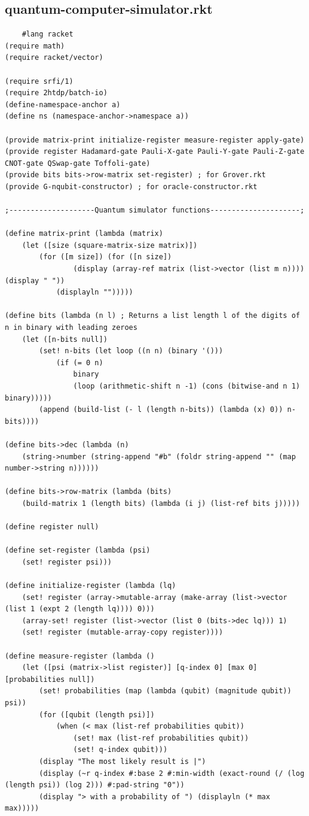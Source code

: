 \documentclass[11pt]{report}
\newcommand{\?}{\stackrel{?}{=}}
\begin{document}
\begin{appendix}
	\chapter{quantum-computer-simulator.rkt}
	\begin{lstlisting}
	#lang racket
(require math)
(require racket/vector)

(require srfi/1)
(require 2htdp/batch-io)
(define-namespace-anchor a)
(define ns (namespace-anchor->namespace a))

(provide matrix-print initialize-register measure-register apply-gate)
(provide register Hadamard-gate Pauli-X-gate Pauli-Y-gate Pauli-Z-gate CNOT-gate QSwap-gate Toffoli-gate)
(provide bits bits->row-matrix set-register) ; for Grover.rkt
(provide G-nqubit-constructor) ; for oracle-constructor.rkt

;--------------------Quantum simulator functions---------------------;

(define matrix-print (lambda (matrix)
	(let ([size (square-matrix-size matrix)])
		(for ([m size]) (for ([n size])
				(display (array-ref matrix (list->vector (list m n)))) (display " "))
			(displayln "")))))

(define bits (lambda (n l) ; Returns a list length l of the digits of n in binary with leading zeroes
	(let ([n-bits null])
		(set! n-bits (let loop ((n n) (binary '()))
			(if (= 0 n) 
				binary
				(loop (arithmetic-shift n -1) (cons (bitwise-and n 1) binary)))))
		(append (build-list (- l (length n-bits)) (lambda (x) 0)) n-bits))))

(define bits->dec (lambda (n)
	(string->number (string-append "#b" (foldr string-append "" (map number->string n))))))

(define bits->row-matrix (lambda (bits)
	(build-matrix 1 (length bits) (lambda (i j) (list-ref bits j)))))

(define register null)

(define set-register (lambda (psi)
	(set! register psi)))

(define initialize-register (lambda (lq)
	(set! register (array->mutable-array (make-array (list->vector (list 1 (expt 2 (length lq)))) 0)))
	(array-set! register (list->vector (list 0 (bits->dec lq))) 1)
	(set! register (mutable-array-copy register))))

(define measure-register (lambda ()
	(let ([psi (matrix->list register)] [q-index 0] [max 0] [probabilities null])
		(set! probabilities (map (lambda (qubit) (magnitude qubit)) psi))
		(for ([qubit (length psi)])
			(when (< max (list-ref probabilities qubit))
				(set! max (list-ref probabilities qubit))
				(set! q-index qubit)))
		(display "The most likely result is |") 
		(display (~r q-index #:base 2 #:min-width (exact-round (/ (log (length psi)) (log 2))) #:pad-string "0"))
		(display "> with a probability of ") (displayln (* max max)))))


\end{lstlisting}
\end{appendix}
\end{document}
